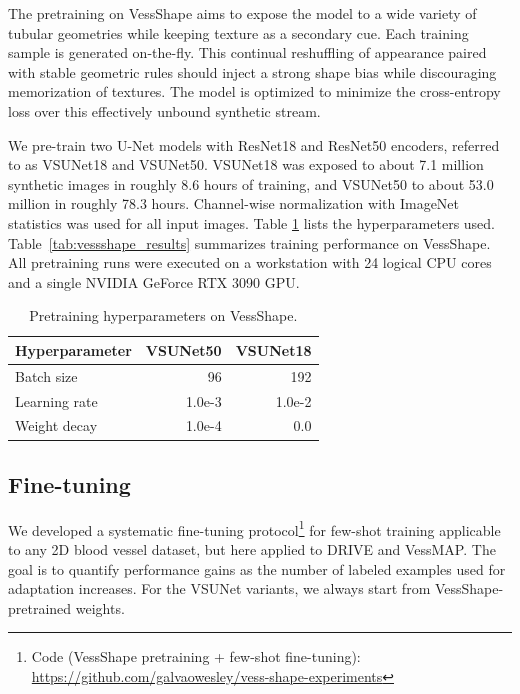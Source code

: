 \documentclass[%
reprint,
nofootinbib,
 amsmath,amssymb,
aps,
superscriptaddress,
showkeys,
longbibliography
]{revtex4-1}
\begin{document}
The pretraining on VessShape aims to expose the model to a wide variety of tubular geometries while keeping texture as a secondary cue. Each training sample is generated on-the-fly. This continual reshuffling of appearance paired with stable geometric rules should inject a strong shape bias while discouraging memorization of textures. The model is optimized to minimize the cross-entropy loss over this effectively unbound synthetic stream. 

We pre-train two U-Net models with ResNet18 and ResNet50 encoders, referred to as VSUNet18 and VSUNet50. VSUNet18 was exposed to about 7.1 million synthetic images in roughly 8.6 hours of training, and VSUNet50 to about 53.0 million in roughly 78.3 hours. Channel-wise normalization with ImageNet statistics was used for all input images. Table \ref{tab:vs_hparams} lists the hyperparameters used. Table~\ref{tab:vessshape_results} summarizes training performance on VessShape. All pretraining runs were executed on a workstation with 24 logical CPU cores and a single NVIDIA GeForce RTX 3090 GPU.

\begin{table}[t]
    \caption{Pretraining hyperparameters on VessShape.}
    \label{tab:vs_hparams}
    \centering
    \begingroup
    \small
    \setlength{\tabcolsep}{6pt}
    \renewcommand{\arraystretch}{1.15}
    \begin{tabular}{l r r}
        \hline
        	\textbf{Hyperparameter} & \textbf{VSUNet50} & \textbf{VSUNet18} \\
        \hline
        Batch size & 96 & 192 \\
        Learning rate & 1.0e-3 & 1.0e-2 \\
        Weight decay & 1.0e-4 & 0.0 \\
        \hline
    \end{tabular}
    \endgroup
\end{table}

\subsection{Fine-tuning}

We developed a systematic fine-tuning protocol\footnote{Code (VessShape pretraining + few-shot fine-tuning): \url{https://github.com/galvaowesley/vess-shape-experiments} } for few-shot training applicable to any 2D blood vessel dataset, but here applied to DRIVE and VessMAP. The goal is to quantify performance gains as the number of labeled examples used for adaptation increases. For the VSUNet variants, we always start from VessShape-pretrained weights.
\end{document}
